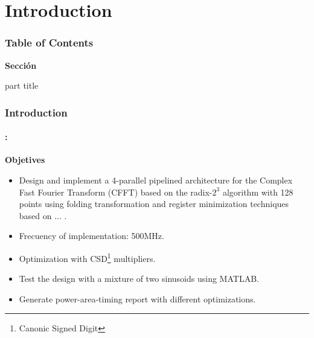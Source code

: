 

\section{Introduction}
\begin{frame}
  \frametitle{\textbf{Table of Contents}}
  \begin{center}
    {\vspace{-1.5cm}\Large \textbf{Sección \thesection}\vspace{0.5cm}}
    \begin{beamercolorbox}[
      sep=8pt,center]{part title}
      \textbf{\insertsection}
    \end{beamercolorbox}
  \end{center}
\end{frame}


\begin{frame}
	\frametitle{\textbf{Introduction}}
	\framesubtitle{\secname : \subsecname}
	\begin{block}{\centering \textbf{Objetives}}
		\begin{itemize} %
  			\item Design and implement a 4-parallel pipelined architecture for the Complex Fast Fourier Transform (CFFT) based on the radix-$2^3$ algorithm with 128 points 	using folding transformation and register minimization techniques based on ... .
   			\item Frecuency of implementation: 500MHz. 
  			\item Optimization with CSD\footnote{Canonic Signed Digit} multipliers.
  			\item Test the design with a mixture of two sinusoids using MATLAB.
  			\item Generate power-area-timing report with different
			optimizations. 			
  		\end{itemize}
    \end{block}
\end{frame}




